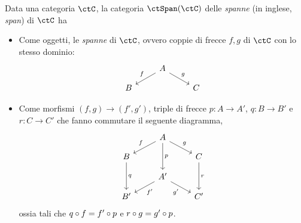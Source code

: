 \begin{definition}\label{def_span_e_cospan}
	Data una categoria \(\ctC\), la categoria \(\ctSpan(\ctC)\) delle \emph{spanne} (in inglese, \emph{span}) di \(\ctC\) ha
	\begin{itemize}
		\item Come oggetti, le \emph{spanne} di \(\ctC\), ovvero coppie di frecce \(f,g\) di \(\ctC\) con lo stesso dominio:
		      \[
			      \begin{tikzcd}[row sep=small]
				      & A \ar{dl}[swap]{f} \ar{dr}{g} \\
				      B && C
			      \end{tikzcd}
		      \]
		\item Come morfismi \((f,g)\to (f',g')\), triple di frecce \(p:A\to A'\), \(q:B\to B'\) e \(r:C\to C'\) che fanno commutare il seguente diagramma,
		      \begin{equation}
			      \begin{tikzcd}[row sep=small]
				      & A \ar{dd}{p} \ar{dl}[swap]{f} \ar{dr}{g} \\
				      B \ar{dd}{q} && C \ar{dd}{r} \\
				      & A' \ar{dl}{f'} \ar{dr}[swap]{g'} \\
				      B' && C'
			      \end{tikzcd}
			      \label{mor_spanne}
		      \end{equation}
		      ossia tali che \(q\circ f=f'\circ p\) e \(r\circ g=g'\circ p\).
	\end{itemize}


\end{definition}
